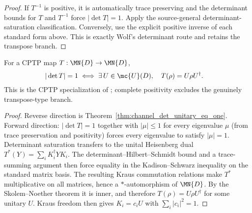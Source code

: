 \begin{proof}\leanok
    If $T^{-1}$ is positive, it is automatically trace preserving and the
    determinant bounds for $T$ and $T^{-1}$ force $|\det T|=1$.  Apply the
    source-general determinant-saturation classification.  Conversely, use
    the explicit positive inverse of each standard form above.  This is
    exactly Wolf's determinant route and retains the transpose branch.
\end{proof}

\begin{theorem}
    \label{thm:channelDet_norm_eq_one_iff_unitary}
    \leanok
    For a CPTP map $T : \MN{D} \to \MN{D}$,
    \begin{align}
        |\det T|=1
        &\iff
        \exists\,U \in \mc{U}(D),\quad T(\rho)=U\rho U^\dagger.
        \label{eq:representations_det_unitary_iff}
    \end{align}
    This is the CPTP specialization of
    \cite[Theorem~6.1(2)]{Wolf2012Quantum}; complete positivity excludes the
    genuinely transpose-type branch.
\end{theorem}

\begin{proof}
    \leanok
    Reverse direction is Theorem~\ref{thm:channel_det_unitary_eq_one}.
    Forward direction: $|\det T|=1$ together with $|\mu|\leq1$ for every
    eigenvalue $\mu$ (from trace preservation and positivity) forces every
    eigenvalue to satisfy $|\mu|=1$. Determinant saturation transfers to the
    unital Heisenberg dual $T^*(Y)=\sum_iK_i^\dagger YK_i$. The
    determinant--Hilbert--Schmidt bound and a trace-summing argument then force
    equality in the Kadison--Schwarz inequality on the standard matrix basis.
    The resulting Kraus commutation relations make $T^*$ multiplicative on all
    matrices, hence a $*$-automorphism of $\MN{D}$. By the Skolem--Noether
    theorem it is inner, and therefore
    $T(\rho)=U\rho U^\dagger$ for some unitary $U$. Kraus freedom then gives
    $K_i=c_iU$ with $\sum_i|c_i|^2=1$.
\end{proof}

